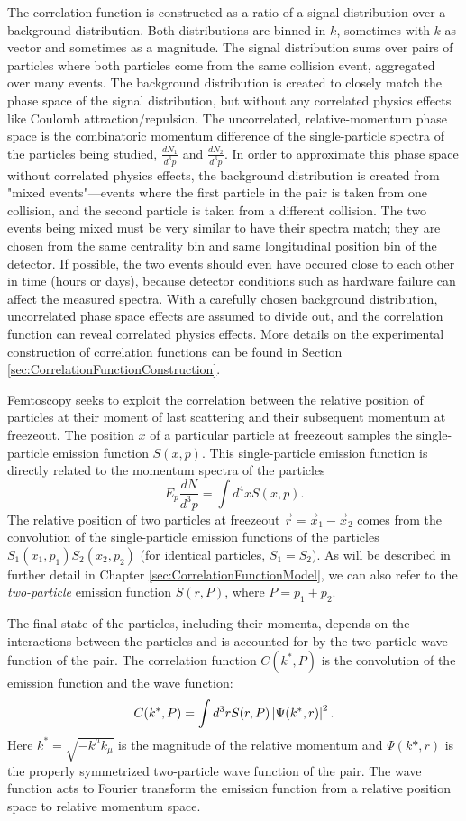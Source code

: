 The correlation function is constructed as a ratio of a signal distribution over a background distribution.
Both distributions are binned in $k$, sometimes with $k$ as vector and sometimes as a magnitude.
The signal distribution sums over pairs of particles where both particles come from the same collision event, aggregated over many events.
The background distribution is created to closely match the phase space of the signal distribution, but without any correlated physics effects like Coulomb attraction/repulsion.
The uncorrelated, relative-momentum phase space is the combinatoric momentum difference of the single-particle spectra of the particles being studied, $\frac{dN_1}{d^3 p}$ and $\frac{dN_2}{d^3 p}$.
In order to approximate this phase space without correlated physics effects, the background distribution is created from "mixed events"---events where the first particle in the pair is taken from one collision, and the second particle is taken from a different collision.
The two events being mixed must be very similar to have their spectra match; they are chosen from the same centrality bin and same longitudinal position bin of the detector.
If possible, the two events should even have occured close to each other in time (hours or days), because detector conditions such as hardware failure can affect the measured spectra.
With a carefully chosen background distribution, uncorrelated phase space effects are assumed to divide out, and the correlation function can reveal correlated physics effects.
More details on the experimental construction of correlation functions can be found in Section \ref{sec:CorrelationFunctionConstruction}.

Femtoscopy seeks to exploit the correlation between the relative position of particles at their moment of last scattering and their subsequent momentum at freezeout.
The position $x$ of a particular particle at freezeout samples the single-particle emission function $S(x,p)$.
This single-particle emission function is directly related to the momentum spectra of the particles
$$E_p \frac{dN}{d^3p} = \int d^4x S(x,p).$$
The relative position of two particles at freezeout $\vec{r} = \vec{x}_1 - \vec{x}_2$ comes from the convolution of the single-particle emission functions of the particles $S_1(x_1,p_1)S_2(x_2,p_2)$ (for identical particles, $S_1 = S_2$).
As will be described in further detail in Chapter \ref{sec:CorrelationFunctionModel}, we can also refer to the \textit{two-particle} emission function $S(r,P)$, where $P = p_1 + p_2$.

The final state of the particles, including their momenta, depends on the interactions between the particles and is accounted for by the two-particle wave function of the pair.
The correlation function $C(k^*,P)$ is the convolution of the emission function and the wave function:
\begin{equation}
\label{eq:KooninPrattInIntro}
C(k^*,P) =  \int d^3r S(r,P) \left\lvert\Psi(k^*,r)\right\rvert^2.
\end{equation}
Here $k^* = \sqrt{-k^\mu k_\mu}$ is the magnitude of the relative momentum and $\Psi(k*,r)$ is the properly symmetrized two-particle wave function of the pair.
The wave function acts to Fourier transform the emission function from a relative position space to relative momentum space.

